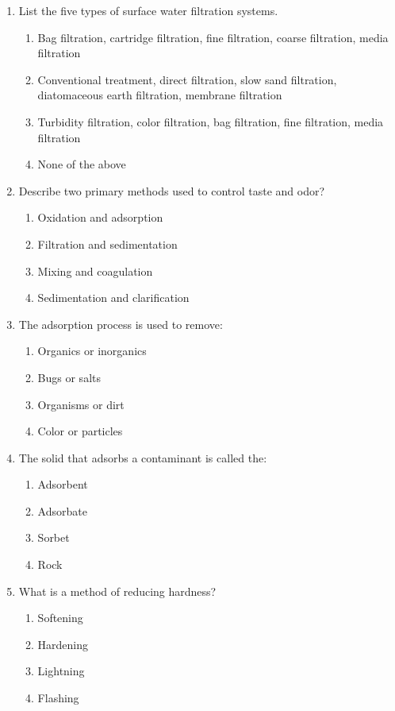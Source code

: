 \documentclass[10pt]{article}
\begin{document}
\begin{enumerate}
\begin{enumerate}
\item List the five types of surface water filtration systems.
\begin{enumerate}
\item Bag filtration, cartridge filtration, fine filtration, coarse filtration, media filtration
\item Conventional treatment, direct filtration, slow sand filtration, diatomaceous earth filtration, membrane filtration
\item Turbidity filtration, color filtration, bag filtration, fine filtration, media filtration
\item None of the above
\end{enumerate}

\item Describe two primary methods used to control taste and odor?
\begin{enumerate}
\item Oxidation and adsorption
\item Filtration and sedimentation
\item Mixing and coagulation
\item Sedimentation and clarification
\end{enumerate}

\item The adsorption process is used to remove:
\begin{enumerate}
\item Organics or inorganics
\item Bugs or salts
\item Organisms or dirt
\item Color or particles
\end{enumerate}

\item The solid that adsorbs a contaminant is called the:
\begin{enumerate}
\item Adsorbent
\item Adsorbate
\item Sorbet
\item Rock
\end{enumerate}

\item What is a method of reducing hardness?
\begin{enumerate}
\item Softening
\item Hardening
\item Lightning
\item Flashing
\end{enumerate}



\end{enumerate}
\end{enumerate}
\end{document}
